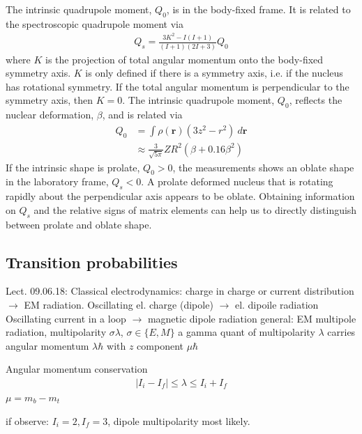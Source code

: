 \documentclass[twoside,english]{uiofysmaster/uiofysmaster}
\begin{document}
The intrinsic quadrupole moment, $Q_0$, is in the body-fixed frame.
It is related to the spectroscopic quadrupole moment via
\begin{align}
	Q_s = \frac{3K^2 - I(I+1)}{(I+1)(2I+3)} Q_0
\end{align}
where $K$ is the projection of total angular momentum onto the body-fixed symmetry axis.
$K$ is only defined if there is a symmetry axis, i.e. if the nucleus has rotational symmetry.
If the total angular momentum is perpendicular to the symmetry axis, then $K = 0$.
The intrinsic quadrupole moment, $Q_0$, reflects the nuclear deformation, $\beta$, and is related via \cite{Klintefjord, LOBNER1970}
\begin{align}
	Q_0 &= \int \rho(\mathbf{r}) (3z^2 - r^2) ~d \mathbf{r} \nonumber \\
	&\approx \frac{3}{\sqrt{5\pi}} Z R^2 (\beta + 0.16 \beta^2)
\end{align}
If the intrinsic shape is prolate, $Q_0 > 0$, the measurements shows an oblate shape in the laboratory frame, $Q_s < 0$.
A prolate deformed nucleus that is rotating rapidly about the perpendicular axis appears to be oblate.
Obtaining information on $Q_s$ and the relative signs of matrix elements can help us to directly distinguish between prolate and oblate shape.


\subsection{Transition probabilities}


Lect. 09.06.18: \newline
Classical electrodynamics: charge in charge or current distribution $\rightarrow$ EM radiation.\newline
Oscillating el. charge (dipole) $\rightarrow$ el. dipoile radiation \newline
Oscillating current in a loop $\rightarrow$ magnetic dipole radiation \newline
general: EM multipole radiation, multipolarity $\sigma \lambda$, $\sigma \in \{ E, M \}$ \newline
a gamma quant of multipolarity $\lambda$ carries angular momentum $\lambda \hbar$ with $z$ component $\mu \hbar$

Angular momentum conservation
\begin{align}
 	| I_i - I_f | \leq \lambda \leq I_i + I_f 
\end{align}
$\mu = m_b - m_t$

if observe: $I_i = 2, I_f = 3$, dipole multipolarity most likely. 
\end{document}
